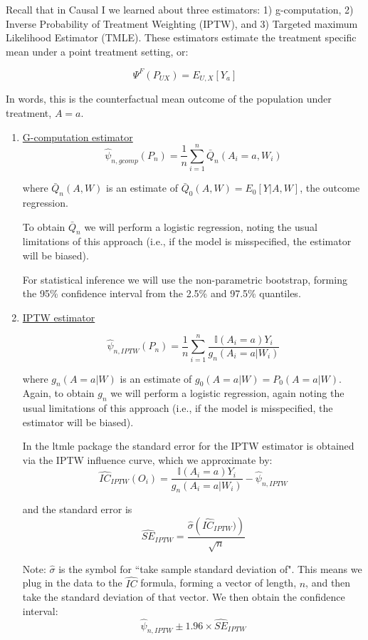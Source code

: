 \documentclass[answers]{exam}
\begin{document}
Recall that in Causal I we learned about three estimators: 1) g-computation, 2) Inverse Probability of Treatment Weighting (IPTW), and 3) Targeted maximum Likelihood Estimator (TMLE). These estimators estimate the treatment specific mean under a point treatment setting, or: 

\[
\Psi^F(P_{UX})=E_{U,X}[Y_{a}]
\]

In words, this is the counterfactual mean outcome of the population under treatment, $A = a$. 

\begin{enumerate}
\item \underline{G-computation estimator}
\[
\hat{\psi}_{n,gcomp}(P_{n})=\frac{1}{n}\sum_{i=1}^{n}\bar{Q}_{n}(A_i=a,W_{i})
\]

where $\bar{Q}_{n}(A,W)$ is an estimate of $\bar{Q}_{0}(A,W)=E_{0}[Y| A,W]$, the outcome regression.

To obtain $\bar{Q}_{n}$ we will perform a logistic regression, noting the usual limitations of this approach (i.e., if the model is misspecified, the estimator will be biased).

For statistical inference we will use the non-parametric bootstrap, forming the 95\% confidence interval from the 2.5\% and 97.5\% quantiles. 

\item \underline{IPTW estimator}

\[
\hat{\psi}_{n, IPTW}(P_{n})=\frac{1}{n}\sum_{i=1}^{n}\frac{\mathbb{I}(A_{i}=a)Y_{i}}{g_{n}(A_{i}=a | W_{i})}
\]

where $g_{n}(A=a\vert W)$ is an estimate of $g_{0}(A=a\vert W)=P_{0}(A=a\vert W)$.
Again, to obtain $g_{n}$ we will perform a logistic regression, again noting the usual limitations of this approach (i.e., if the model is misspecified, the estimator will be biased).

In the ltmle package the standard error for the IPTW estimator is obtained via the IPTW influence curve, which we approximate by:
\[
\hat{IC}_{IPTW}(O_{i})=\frac{\mathbb{I}(A_{i}=a)Y_{i}}{g_{n}(A_{i}=a\vert W_{i})}-\hat{\psi}_{n,IPTW}
\]

and the standard error is
\[
\hat{SE}_{IPTW}=\frac{\hat{\sigma}\left(\hat{IC}_{IPTW})\right)}{\sqrt{n}}
\]

Note: $\hat{\sigma}$ is the symbol for ``take sample standard deviation of".  This means we plug in the data to the $\hat{IC}$ formula, forming a vector of length, $n$, and then take the standard deviation of that vector. We then obtain the confidence interval:
\[
\hat{\psi}_{n, IPTW}\pm 1.96\times \hat{SE}_{IPTW}
\]


\end{enumerate}
\end{document}
